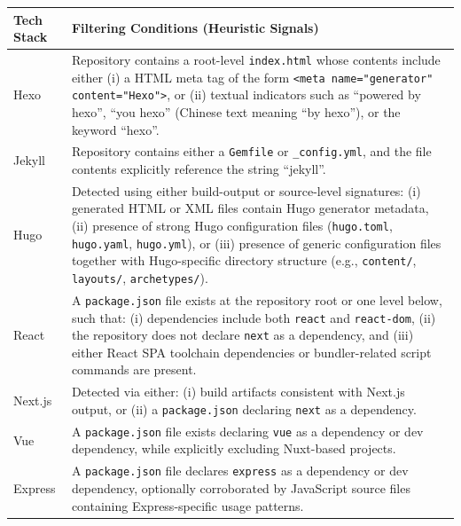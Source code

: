 \begin{table}[t]
\centering
\small
\renewcommand{\arraystretch}{1.25}
\begin{tabularx}{\textwidth}{p{3.2cm} X}
\hline
\textbf{Tech Stack} & \textbf{Filtering Conditions (Heuristic Signals)} \\
\hline

Hexo &
Repository contains a root-level \texttt{index.html} whose contents include either
(i) a HTML meta tag of the form \texttt{<meta name="generator" content="Hexo">}, or
(ii) textual indicators such as ``powered by hexo'', ``you hexo'' (Chinese text meaning ``by hexo''), or the keyword ``hexo''. \\

Jekyll &
Repository contains either a \texttt{Gemfile} or \texttt{\_config.yml}, and the file contents explicitly reference the string ``jekyll''. \\

Hugo &
Detected using either build-output or source-level signatures:
(i) generated HTML or XML files contain Hugo generator metadata,
(ii) presence of strong Hugo configuration files (\texttt{hugo.toml}, \texttt{hugo.yaml}, \texttt{hugo.yml}), or
(iii) presence of generic configuration files together with Hugo-specific directory structure
(e.g., \texttt{content/}, \texttt{layouts/}, \texttt{archetypes/}). \\

React &
A \texttt{package.json} file exists at the repository root or one level below, such that:
(i) dependencies include both \texttt{react} and \texttt{react-dom},
(ii) the repository does not declare \texttt{next} as a dependency, and
(iii) either React SPA toolchain dependencies or bundler-related script commands are present. \\

Next.js &
Detected via either:
(i) build artifacts consistent with Next.js output, or
(ii) a \texttt{package.json} declaring \texttt{next} as a dependency. \\

Vue &
A \texttt{package.json} file exists declaring \texttt{vue} as a dependency or dev dependency, while explicitly excluding Nuxt-based projects. \\

Express &
A \texttt{package.json} file declares \texttt{express} as a dependency or dev dependency, optionally corroborated by JavaScript source files containing Express-specific usage patterns. \\


\end{tabularx}
\end{table}
